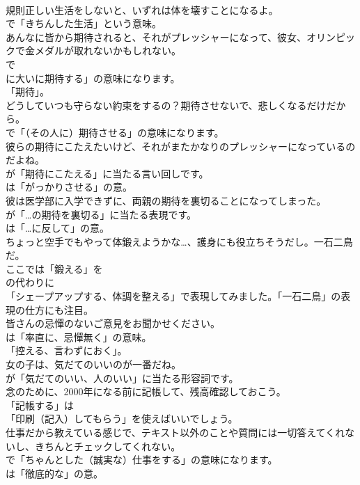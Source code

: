 \documentclass[8pt]{extreport}
\begin{document}
\begin{CJK}{UTF8}{min}
\\	規則正しい生活をしないと、いずれは体を壊すことになるよ。 
\\	で「きちんした生活」という意味。	
\\	あんなに皆から期待されると、それがプレッシャーになって、彼女、オリンピックで金メダルが取れないかもしれない。 
\\	で
\\	に大いに期待する」の意味になります。
\\	「期待」。	
\\	どうしていつも守らない約束をするの？期待させないで、悲しくなるだけだから。 
\\	で「（その人に）期待させる」の意味になります。	
\\	彼らの期待にこたえたいけど、それがまたかなりのプレッシャーになっているのだよね。 
\\	が「期待にこたえる」に当たる言い回しです。
\\	は「がっかりさせる」の意。	
\\	彼は医学部に入学できずに、両親の期待を裏切ることになってしまった。 
\\	が「…の期待を裏切る」に当たる表現です。
\\	は「…に反して」の意。	
\\	ちょっと空手でもやって体鍛えようかな…、護身にも役立ちそうだし。一石二鳥だ。 
\\	ここでは「鍛える」を
\\	の代わりに
\\	「シェープアップする、体調を整える」で表現してみました。「一石二鳥」の表現の仕方にも注目。	
\\	皆さんの忌憚のないご意見をお聞かせください。 
\\	は「率直に、忌憚無く」の意味。
\\	「控える、言わずにおく」。	
\\	女の子は、気だてのいいのが一番だね。 
\\	が「気だてのいい、人のいい」に当たる形容詞です。	
\\	念のために、2000年になる前に記帳して、残高確認しておこう。 
\\	「記帳する」は
\\	「印刷（記入）してもらう」を使えばいいでしょう。	
\\	仕事だから教えている感じで、テキスト以外のことや質問には一切答えてくれないし、きちんとチェックしてくれない。 
\\	で「ちゃんとした（誠実な）仕事をする」の意味になります。
\\	は「徹底的な」の意。	

\end{CJK}
\end{document}
